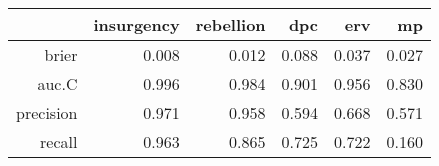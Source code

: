 \begin{tabular}{rrrrrr}
  \hline
 & insurgency & rebellion & dpc & erv & mp \\ 
  \hline
brier & 0.008 & 0.012 & 0.088 & 0.037 & 0.027 \\ 
  auc.C & 0.996 & 0.984 & 0.901 & 0.956 & 0.830 \\ 
  precision & 0.971 & 0.958 & 0.594 & 0.668 & 0.571 \\ 
  recall & 0.963 & 0.865 & 0.725 & 0.722 & 0.160 \\ 
   \hline
\end{tabular}
